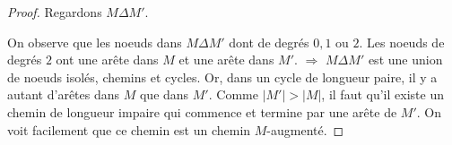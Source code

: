 \begin{mytheo} [Berge]
\begin{proof}
     Regardons $ M \Delta M'$.

\begin{center}
\end{center}

     On observe que les noeuds dans $ M \Delta M'$ dont de degrés $0,1$ ou $2$. Les noeuds de degrés $2$ ont une arête dans $M$ et une arête dans $M'$. $\Rightarrow$ $ M \Delta M'$ est une union de noeuds isolés, chemins et cycles. Or, dans un cycle de longueur paire, il y a autant d'arêtes dans $M$ que dans $M'$. Comme  $ |M'| > |M| $, il faut qu'il existe un chemin de longueur impaire qui commence et termine par une arête de $M'$. On voit facilement que ce chemin est un chemin $M$-augmenté.

  \end{proof}
\end{mytheo}

